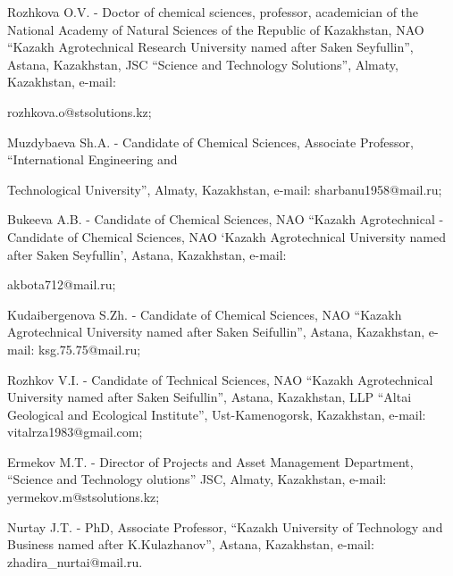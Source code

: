 \begin{noparindent}
Rozhkova O.V. - Doctor of chemical sciences, professor, academician of
the National Academy of Natural Sciences of the Republic of Kazakhstan,
NAO ``Kazakh Agrotechnical Research University named after Saken
Seyfullin'', Astana, Kazakhstan, JSC ``Science and Technology
Solutions'', Almaty, Kazakhstan, e-mail:

rozhkova.o@stsolutions.kz;

Muzdybaeva Sh.A. - Candidate of Chemical Sciences, Associate Professor,
``International Engineering and

Technological University'', Almaty,
Kazakhstan, e-mail: sharbanu1958@mail.ru;

Bukeeva A.B. - Candidate of Chemical Sciences, NAO ``Kazakh
Agrotechnical - Candidate of Chemical Sciences, NAO `Kazakh
Agrotechnical University named after Saken Seyfullin', Astana,
Kazakhstan, e-mail:

akbota712@mail.ru;

Kudaibergenova S.Zh. - Candidate of Chemical Sciences, NAO ``Kazakh
Agrotechnical University named after Saken Seifullin'', Astana,
Kazakhstan, e-mail: ksg.75.75@mail.ru;

Rozhkov V.I. - Candidate of Technical Sciences, NAO ``Kazakh
Agrotechnical University named after Saken Seifullin'', Astana,
Kazakhstan, LLP ``Altai Geological and Ecological Institute'',
Ust-Kamenogorsk, Kazakhstan, e-mail: vitalrza1983@gmail.com;

Ermekov M.T. - Director of Projects and Asset Management Department,
``Science and Technology olutions'' JSC, Almaty, Kazakhstan, e-mail:
yermekov.m@stsolutions.kz;

Nurtay J.T. - PhD, Associate Professor, ``Kazakh University of
Technology and Business named after K.Kulazhanov'', Astana, Kazakhstan,
e-mail: zhadira\_nurtai@mail.ru.
\end{noparindent}
